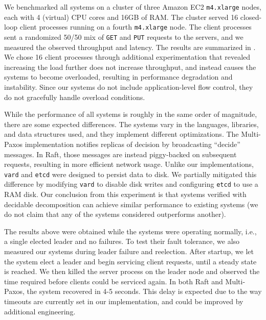 We benchmarked all systems on a cluster of three Amazon EC2
\texttt{m4.xlarge} nodes, each with 4 (virtual) CPU cores and 16GB of RAM. The
cluster served 16 closed-loop client processes running on a fourth
\texttt{m4.xlarge} node.
The client processes sent a randomized 50/50 mix of
\texttt{GET} and \texttt{PUT} requests to the servers,
and we measured the observed throughput and latency.
The results are summarized in .
%
We chose 16 client processes through additional experimentation
that revealed increasing the load further does not increase
throughput, and instead causes the systems to become overloaded,
resulting in performance degradation and instability. Since our
systems do not include application-level flow control, they do not
gracefully handle overload conditions.

While the performance of all systems is roughly in the same order of
magnitude, there are some expected differences.  The systems vary
in the languages, libraries, and data structures used,
and they implement different optimizations.
%
The Multi-Paxos implementation notifies replicas of decision by broadcasting
``decide'' messages. In Raft, those messages are instead piggy-backed on
subsequent requests, resulting in more efficient network usage.
%
Unlike our implementations, \texttt{vard} and \texttt{etcd} were designed to persist data to disk.
%
We partially mitigated this difference by modifying \texttt{vard} to disable disk writes
and configuring \texttt{etcd} to use a RAM disk.
%
Our conclusion from this experiment is that
systems verified with decidable decomposition can achieve
similar performance to existing systems (we do not claim that any of the systems considered outperforms another).

The results above were obtained while the systems were operating normally, i.e., a single elected leader and no failures.
To test their fault tolerance, we also measured our systems during leader failure and reelection. 
After startup, we let the system elect a leader and begin servicing client requests, until a steady state is reached.
We then killed the server process on the leader node and observed the time required before clients could be serviced again.
In both Raft and Multi-Paxos, the system recovered in 4-5 seconds.
This delay is expected due to the way timeouts are currently set in our implementation, and could be improved by additional engineering.

